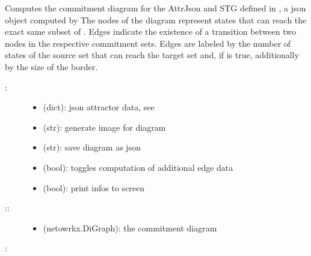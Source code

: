 \documentclass[letterpaper,10pt,english]{sphinxmanual}
\begin{document}
\begin{fulllineitems}
\label{\detokenize{Commitment:PyBoolNet.Commitment.compute_diagram}}
Computes the commitment diagram for the AttrJson and STG defined in , a json object computed by 
The nodes of the diagram represent states that can reach the exact same subset of .
Edges indicate the existence of a transition between two nodes in the respective commitment sets.
Edges are labeled by the number of states of the source set that can reach the target set and,
if  is true, additionally by the size of the border.
\begin{description}
\item[{:}] \leavevmode\begin{itemize}
\item {} 
 (dict): json attractor data, see 

\item {} 
 (str): generate image for diagram

\item {} 
 (str): save diagram as json

\item {} 
 (bool): toggles computation of additional edge data

\item {} 
 (bool): print infos to screen

\end{itemize}

\item[{::}] \leavevmode\begin{itemize}
\item {} 
 (netowrkx.DiGraph): the commitment diagram

\end{itemize}

\end{description}

:

\begin{sphinxVerbatim}[commandchars=\\\{\}]
   
  
\end{sphinxVerbatim}

\end{fulllineitems}
\end{document}
